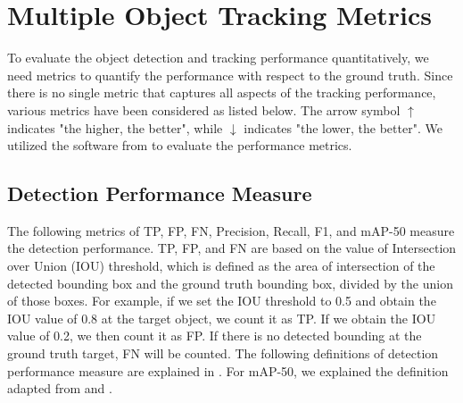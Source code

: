 \section{Multiple Object Tracking Metrics}
\label{sec:background/section_d}

To evaluate the object detection and tracking performance quantitatively, we need metrics to quantify the performance with respect to the ground truth. Since there is no single metric that captures all aspects of the tracking performance, various metrics have been considered as listed below. The arrow symbol $\uparrow$ indicates "the higher, the better", while $\downarrow$ indicates "the lower, the better". We utilized the software from \cite{heindl_cheindpy-motmetrics_2021} to evaluate the performance metrics.

\subsection{Detection Performance Measure}
The following metrics of TP, FP, FN, Precision, Recall, F1, and mAP-50 measure the detection performance. TP, FP, and FN are based on the value of Intersection over Union (IOU) threshold, which is defined as the area of intersection of the detected bounding box and the ground truth bounding box, divided by the union of those boxes. For example, if we set the IOU threshold to 0.5 and obtain the IOU value of 0.8 at the target object, we count it as TP. If we obtain the IOU value of 0.2, we then count it as FP. If there is no detected bounding at the ground truth target, FN will be counted. The following definitions of detection performance measure are explained in \cite{ristani_performance_2016} \cite{milan_mot16_2016}. For mAP-50, we explained the definition adapted from \cite{padilla_survey_2020} and \cite{padilla_comparative_2021}.

